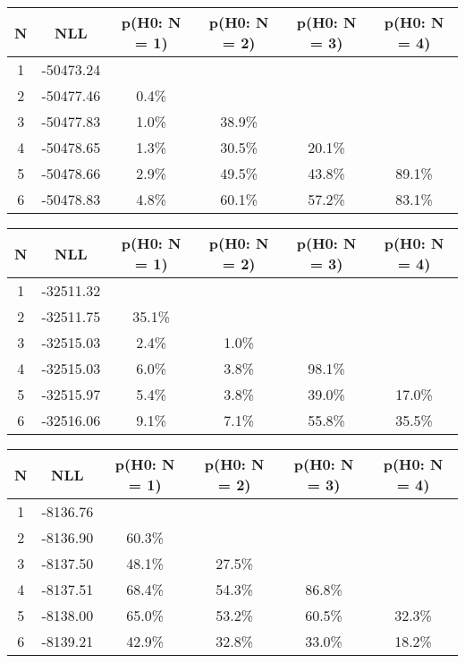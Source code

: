 \begin{table}[htb]
	\begin{center}
{\footnotesize\renewcommand{\arraystretch}{1.4}
		\begin{tabular}{cc||cccc}
			N & NLL & p(H0: N = 1) & p(H0: N = 2) & p(H0: N = 3) & p(H0: N = 4)\\ 
		\hline
1 & -50473.24 & & & & \\
2 & -50477.46 & 0.4\% & & & \\
3 & -50477.83 & 1.0\% & 38.9\% & & \\
4 & -50478.65 & 1.3\% & 30.5\% & 20.1\% & \\
5 & -50478.66 & 2.9\% & 49.5\% & 43.8\% & 89.1\% \\
6 & -50478.83 & 4.8\% & 60.1\% & 57.2\% & 83.1\% \\
	\end{tabular}
		\label{tab:lab}
	}
	\end{center}\end{table}

\begin{table}[htb]
	\begin{center}
{\footnotesize\renewcommand{\arraystretch}{1.4}
		\begin{tabular}{cc||cccc}
			N & NLL & p(H0: N = 1) & p(H0: N = 2) & p(H0: N = 3) & p(H0: N = 4)\\ 
		\hline
1 & -32511.32 & & & & \\
2 & -32511.75 & 35.1\% & & & \\
3 & -32515.03 & 2.4\% & 1.0\% & & \\
4 & -32515.03 & 6.0\% & 3.8\% & 98.1\% & \\
5 & -32515.97 & 5.4\% & 3.8\% & 39.0\% & 17.0\% \\
6 & -32516.06 & 9.1\% & 7.1\% & 55.8\% & 35.5\% \\
	\end{tabular}
		\label{tab:lab}
	}
	\end{center}\end{table}

\begin{table}[htb]
	\begin{center}
{\footnotesize\renewcommand{\arraystretch}{1.4}
		\begin{tabular}{cc||cccc}
			N & NLL & p(H0: N = 1) & p(H0: N = 2) & p(H0: N = 3) & p(H0: N = 4)\\ 
		\hline
1 & -8136.76 & & & & \\
2 & -8136.90 & 60.3\% & & & \\
3 & -8137.50 & 48.1\% & 27.5\% & & \\
4 & -8137.51 & 68.4\% & 54.3\% & 86.8\% & \\
5 & -8138.00 & 65.0\% & 53.2\% & 60.5\% & 32.3\% \\
6 & -8139.21 & 42.9\% & 32.8\% & 33.0\% & 18.2\% \\
	\end{tabular}
		\label{tab:lab}
	}
	\end{center}\end{table}

